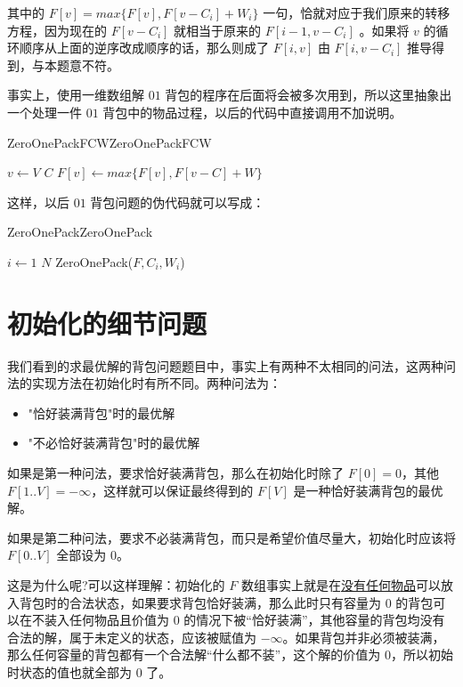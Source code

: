 \documentclass[cn, 11pt, chinese, toc=twocol]{elegantbook}
\begin{document}
其中的 $F[v] = max\{F[v], F[v-C_i] + W_i \}$ 一句，恰就对应于我们原来的转移方程，因为现在的 $F[v-C_i]$ 就相当于原来的 $F[i-1, v-C_i]$ 。如果将 $v$ 的循环顺序从上面的逆序改成顺序的话，那么则成了 $F[i, v]$ 由 $F[i, v-C_i]$ 推导得到，与本题意不符。

事实上，使用一维数组解 $01$ 背包的程序在后面将会被多次用到，所以这里抽象出一个处理一件 $01$ 背包中的物品过程，以后的代码中直接调用不加说明。

\begin{definition}{ZeroOnePackFCW}{ZeroOnePackFCW}
\begin{codebox}
    \li \For $v \gets V$ \To $C$
        \Do
     \li  $F[v] \gets max\{F[v], F[v-C] + W \}$
        \End
\end{codebox}
\end{definition}

这样，以后 $01$ 背包问题的伪代码就可以写成：
\begin{definition}{ZeroOnePack}{ZeroOnePack}
\begin{codebox}
    \li \For $i \gets 1$ \To $N$
        \Do
    \li  ZeroOnePack($F, C_i, W_i$)
        \End
\end{codebox}
\end{definition}

\section{初始化的细节问题}
我们看到的求最优解的背包问题题目中，事实上有两种不太相同的问法，这两种问法的实现方法在初始化时有所不同。两种问法为：
\begin{itemize}
  \item "恰好装满背包"时的最优解
  \item "不必恰好装满背包"时的最优解
\end{itemize}

如果是第一种问法，要求恰好装满背包，那么在初始化时除了 $F[0] = 0$，其他 $F[1..V] = -\infty$，这样就可以保证最终得到的 $F[V]$
是一种恰好装满背包的最优解。

如果是第二种问法，要求不必装满背包，而只是希望价值尽量大，初始化时应该将 $F[0..V]$ 全部设为 $0$。

这是为什么呢?可以这样理解：初始化的 $F$ 数组事实上就是在\textcolor{structure3}{\underline{没有任何物品}}可以放入背包时的合法状态，如果要求背包恰好装满，那么此时只有容量为 $0$ 的背包可以在不装入任何物品且价值为 $0$ 的情况下被“恰好装满”，其他容量的背包均没有合法的解，属于未定义的状态，应该被赋值为 $-\infty$。如果背包并非必须被装满，那么任何容量的背包都有一个合法解“什么都不装”，这个解的价值为 $0$，所以初始时状态的值也就全部为 $0$ 了。
\end{document}
